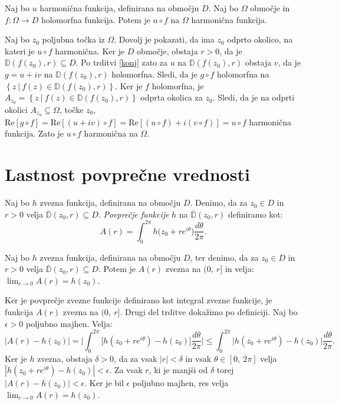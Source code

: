 \documentclass[mat1]{fmfdelo}
\begin{document}
    \begin{trditev}
        \label{komp_s_hol}
        Naj bo $u$ harmonična funkcija, definirana na območju $D$. Naj bo $\Omega$ območje in $f : \Omega \to D$ holomorfna funkcija. Potem je $u \circ f$ na $\Omega$ harmonična funkcija.
    \end{trditev}
    \begin{dokaz}
        Naj bo $z_0$ poljubna točka iz $\Omega$. Dovolj je pokazati, da ima $z_0$ odprto okolico, na kateri je $u \circ f$ harmonična. Ker je $D$ območje, obstaja $r > 0$, da je \mbox{$\mathbb{D}(f(z_0), r) \subseteq D$}. 
        Po trditvi \ref{konj} zato za $u$ na $\mathbb{D}(f(z_0),r)$ obstaja $v$, da je $g = u + iv$ na $\mathbb{D}(f(z_0), r)$ holomorfna. Sledi, da je $g \circ f$ holomorfna na $\left\{z~|~ f(z) \in \mathbb{D}(f(z_0), r)\right\}$.
        Ker je $f$ holomorfna, je $A_{z_0} = \left\{z~|~ f(z) \in \mathbb{D}(f(z_0), r)\right\}$ odprta okolica za $z_0$. Sledi, da je na odprti okolici $A_{z_0} \subseteq \Omega$, točke $z_0$, $\text{Re}[g \circ f] = \text{Re}[(u + iv)\circ f] = \text{Re}[(u \circ f) + i(v \circ f)] = u \circ f$ harmonična funkcija. 
        Zato je $u \circ f$ harmonična na $\Omega$.
    \end{dokaz}

\section{Lastnost povprečne vrednosti}

    \begin{definicija}  
        Naj bo $h$ zvezna funkcija, definirana na območju $D$. Denimo, da za $z_0 \in D$ in $r > 0$ velja $\overline{\mathbb{D}}(z_0, r) \subseteq D$. \emph{Povprečje funkcije} $h$ na $\overline{\mathbb{D}}(z_0, r)$ definiramo kot:
        $$
            A(r) = \int_{0}^{2 \pi}{h \big(z_0 + r e^{i\theta}\big)\frac{d\theta}{2 \pi}}.
        $$
    \end{definicija}
    \begin{trditev}
        \label{zvpov}
        Naj bo $h$ zvezna funkcija, definirana na območju $D$, ter denimo, da za $z_0 \in D$ in $r > 0$ velja $\overline{\mathbb{D}}(z_0, r) \subseteq D$. 
        Potem je $A(r)$ zvezna na $(0,~r]$ in velja: $\lim_{r \to 0}{A(r)} = h(z_0)$.
    \end{trditev}
    \begin{dokaz}
        Ker je povprečje zvezne funkcije definirano kot integral zvezne funkcije, je funkcija $A(r)$ zvezna na $(0,~r]$. Drugi del trditve dokažimo po definiciji.
        Naj bo $\epsilon > 0$ poljubno majhen. Velja:
        $$
            |A(r) - h(z_0)| = \bigg|\int_{0}^{2\pi} \big[h(z_0 + r e^{i\theta})  - h(z_0)\big] \frac{d\theta}{2\pi} \bigg| \leq \int_{0}^{2 \pi} \big| h(z_0 + r e^{i\theta}) - h(z_0) \big| \frac{d\theta}{2 \pi}.
        $$
        Ker je $h$ zvezna, obstaja $\delta > 0$, da za vsak $|r| < \delta$ in vsak $\theta \in [0,~2\pi]$ velja \mbox{$|h(z_0 + r e^{i\theta}) - h(z_0)| < \epsilon$}.
        Za vsak $r$, ki je manjši od $\delta$ torej $|A(r) - h(z_0)| < \epsilon$. Ker je bil $\epsilon$ poljubno majhen, res velja $\lim_{r \to 0}{A(r)} = h(z_0)$.
    \end{dokaz}
\end{document}
